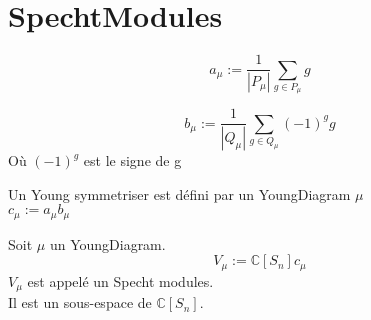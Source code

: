 \chapter{SpechtModules}

\begin{definition}[au]
    \label{au}
    \leanok
    \[ a_{\mu} := \frac{1}{|P_{\mu}|}\sum_{g \in P_{\mu}}g \]
\end{definition}

\begin{definition}[bu]
    \label{bu}
    \leanok
    \[ b_{\mu} := \frac{1}{|Q_{\mu}|}\sum_{g \in Q_{\mu}}(-1)^{g}g \]
    Où $(-1)^{g}$ est le signe de g
\end{definition}

\begin{definition}[YoungSymmetriser]
    \label{YoungSymmetriser}
    \leanok
    Un Young symmetriser est défini par un YoungDiagram $\mu$\\
    $c_{\mu} := a_{\mu} b_{\mu} $
\end{definition}

\begin{definition}[SpechtModules]
    \label{SpechtModules}
    Soit $\mu$ un YoungDiagram.
    \[ V_{\mu} := \mathbb{C}[S_{n}]c_{\mu} \]
    $V_{\mu}$ est appelé un Specht modules.\\
    Il est un sous-espace de $\mathbb{C}[S_{n}]$.
\end{definition}

